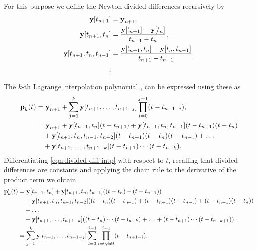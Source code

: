 For this purpose we define the Newton divided differences recursively by
\begin{equation}
  \label{eqn:divided-diff}
  \begin{aligned}
    \boldsymbol{\mathrm{y}}[t_{n+1}] &= \boldsymbol{\mathrm{y}}_{n+1}, \\
    \boldsymbol{\mathrm{y}}[t_{n+1}, t_n] &= \frac{\boldsymbol{\mathrm{y}}[t_{n+1}] - \boldsymbol{\mathrm{y}}[t_n]}{t_{n+1} - t_n}, \\
    \boldsymbol{\mathrm{y}}[t_{n+1}, t_n, t_{n-1}] &= \frac{\boldsymbol{\mathrm{y}}[t_{n+1}, t_n] - \boldsymbol{\mathrm{y}}[t_n, t_{n-1}]}{t_{n+1} - t_{n-1}}, \\
    \vdots
  \end{aligned}
\end{equation}
The $k$-th Lagrange interpolation polynomial \cite[124]{BurdenFaires}, \cite[400]{HairerNorsettWanner} can be expressed using these as
\begin{equation}
  \label{eqn:divided-diff-intp}
  \begin{aligned}
    {\boldsymbol{\mathrm{p}}}_k(t) &= \boldsymbol{\mathrm{y}}_{n+1} + \sum_{j=1}^k \boldsymbol{\mathrm{y}}[t_{n+1}, \ldots, t_{n+1-j}] \prod_{i=0}^{j-1} (t - t_{n+1-i}), \\
    &= \boldsymbol{\mathrm{y}}_{n+1} + \boldsymbol{\mathrm{y}}[t_{n+1}, t_n](t - t_{n+1}) + \boldsymbol{\mathrm{y}}[t_{n+1}, t_n, t_{n-1}](t - t_{n+1})(t - t_n) \\
    &\quad + \boldsymbol{\mathrm{y}}[t_{n+1}, t_n, t_{n-1}, t_{n-2}](t - t_{n+1})(t - t_n)(t - t_{n-1}) + \ldots \\
    &\quad + \boldsymbol{\mathrm{y}}[t_{n+1}, \ldots, t_{n+1-k}](t-t_{n+1})\cdots(t-t_{n-k}).
  \end{aligned}
\end{equation}
Differentiating \cref{eqn:divided-diff-intp} with respect to $t$, recalling that divided differences are constants and applying the chain rule to the derivative of the product term we obtain
\begin{equation}
  \begin{aligned}
    {\boldsymbol{\mathrm{p}}}_k'(t) &= \boldsymbol{\mathrm{y}}[t_{n+1}, t_n] + \boldsymbol{\mathrm{y}}[t_{n+1}, t_n, t_{n-1}]{\left( (t - t_n) + (t - t_{n+1}) \right)} \\
    &\quad + \boldsymbol{\mathrm{y}}[t_{n+1}, t_n, t_{n-1}, t_{n-2}]{\left( (t - t_n)(t - t_{n-1}) + (t - t_{n+1})(t - t_{n-1}) + (t - t_{n+1})(t - t_n) \right)} \\
    &\quad + \ldots \\
    &\quad + \boldsymbol{\mathrm{y}}[t_{n+1}, \ldots, t_{n+1-k}]{\left( (t-t_{n})\cdots(t-t_{n-k}) + \ldots + (t-t_{n+1})\cdots(t-t_{n-k+1}) \right)}, \\
    &= \sum_{j=1}^k \boldsymbol{\mathrm{y}}[t_{n+1}, \ldots, t_{n+1-j}] \sum_{l=0}^{j-1} \prod_{i=0, i \neq l}^{j-1} (t - t_{n+1-i}).
    \label{eq:59}
  \end{aligned}
\end{equation}
